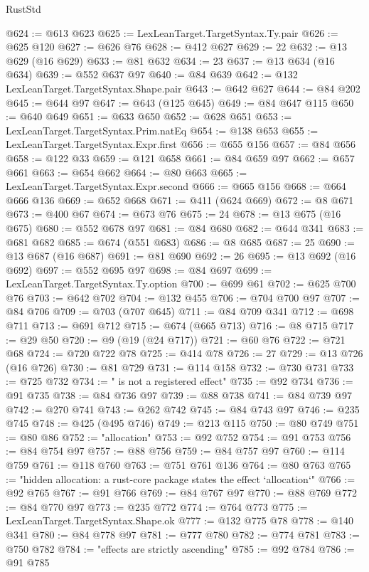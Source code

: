 \begin{lexlean}{RustStd}
\begin{coremodule}
@624 := @613 @623
@625 := LexLeanTarget.TargetSyntax.Ty.pair
@626 := @625 @120
@627 := @626 @76
@628 := @412 @627
@629 := 22
@632 := @13 @629 (@16 @629)
@633 := @81 @632
@634 := 23
@637 := @13 @634 (@16 @634)
@639 := @552 @637 @97
@640 := @84 @639
@642 := @132 LexLeanTarget.TargetSyntax.Shape.pair
@643 := @642 @627
@644 := @84 @202
@645 := @644 @97
@647 := @643 (@125 @645)
@649 := @84 @647 @115
@650 := @640 @649
@651 := @633 @650
@652 := @628 @651
@653 := LexLeanTarget.TargetSyntax.Prim.natEq
@654 := @138 @653
@655 := LexLeanTarget.TargetSyntax.Expr.first
@656 := @655 @156
@657 := @84 @656
@658 := @122 @33
@659 := @121 @658
@661 := @84 @659 @97
@662 := @657 @661
@663 := @654 @662
@664 := @80 @663
@665 := LexLeanTarget.TargetSyntax.Expr.second
@666 := @665 @156
@668 := @664 @666 @136
@669 := @652 @668
@671 := @411 (@624 @669)
@672 := @8 @671
@673 := @400 @67
@674 := @673 @76
@675 := 24
@678 := @13 @675 (@16 @675)
@680 := @552 @678 @97
@681 := @84 @680
@682 := @644 @341
@683 := @681 @682
@685 := @674 (@551 @683)
@686 := @8 @685
@687 := 25
@690 := @13 @687 (@16 @687)
@691 := @81 @690
@692 := 26
@695 := @13 @692 (@16 @692)
@697 := @552 @695 @97
@698 := @84 @697
@699 := LexLeanTarget.TargetSyntax.Ty.option
@700 := @699 @61
@702 := @625 @700 @76
@703 := @642 @702
@704 := @132 @455
@706 := @704 @700 @97
@707 := @84 @706
@709 := @703 (@707 @645)
@711 := @84 @709 @341
@712 := @698 @711
@713 := @691 @712
@715 := @674 (@665 @713)
@716 := @8 @715
@717 := @29 @50
@720 := @9 (@19 (@24 @717))
@721 := @60 @76
@722 := @721 @68
@724 := @720 @722 @78
@725 := @414 @78
@726 := 27
@729 := @13 @726 (@16 @726)
@730 := @81 @729
@731 := @114 @158
@732 := @730 @731
@733 := @725 @732
@734 := " is not a registered effect"
@735 := @92 @734
@736 := @91 @735
@738 := @84 @736 @97
@739 := @88 @738
@741 := @84 @739 @97
@742 := @270 @741
@743 := @262 @742
@745 := @84 @743 @97
@746 := @235 @745
@748 := @425 (@495 @746)
@749 := @213 @115
@750 := @80 @749
@751 := @80 @86
@752 := "allocation"
@753 := @92 @752
@754 := @91 @753
@756 := @84 @754 @97
@757 := @88 @756
@759 := @84 @757 @97
@760 := @114 @759
@761 := @118 @760
@763 := @751 @761 @136
@764 := @80 @763
@765 := "hidden allocation: a rust-core package states the effect `allocation`"
@766 := @92 @765
@767 := @91 @766
@769 := @84 @767 @97
@770 := @88 @769
@772 := @84 @770 @97
@773 := @235 @772
@774 := @764 @773
@775 := LexLeanTarget.TargetSyntax.Shape.ok
@777 := @132 @775 @78
@778 := @140 @341
@780 := @84 @778 @97
@781 := @777 @780
@782 := @774 @781
@783 := @750 @782
@784 := "effects are strictly ascending"
@785 := @92 @784
@786 := @91 @785

\end{coremodule}
\end{lexlean}
